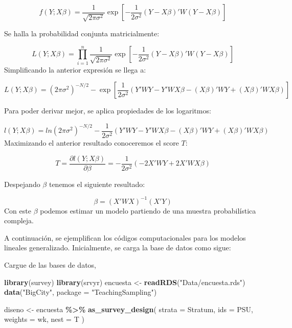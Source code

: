 \documentclass[
  spanish,
  12pt,
]{book}
\newenvironment{Shaded}{\begin{snugshade}}{\end{snugshade}}
\newcommand{\AttributeTok}[1]{\textcolor[rgb]{0.13,0.29,0.53}{#1}}
\newcommand{\FunctionTok}[1]{\textcolor[rgb]{0.13,0.29,0.53}{\textbf{#1}}}
\newcommand{\NormalTok}[1]{#1}
\newcommand{\OtherTok}[1]{\textcolor[rgb]{0.56,0.35,0.01}{#1}}
\newcommand{\SpecialCharTok}[1]{\textcolor[rgb]{0.81,0.36,0.00}{\textbf{#1}}}
\newcommand{\StringTok}[1]{\textcolor[rgb]{0.31,0.60,0.02}{#1}}
\begin{document}
\[
f(Y;X\beta)=\dfrac{1}{\sqrt{2\pi\sigma^{2}}}\exp\left[-\dfrac{1}{2\sigma^{2}}(Y-X\beta)'W(Y-X\beta)\right]
\]

Se halla la probabilidad conjunta matricialmente:

\[
L(Y;X\beta)=\prod_{i=1}^{n}\dfrac{1}{\sqrt{2\pi\sigma^{2}}}\exp\left[-\dfrac{1}{2\sigma^{2}}(Y-X\beta)'W(Y-X\beta)\right]
\]
Simplificando la anterior expresión se llega a:

\[
L(Y;X\beta)=(2\pi\sigma^{2})^{-N/2}-\exp\left[\dfrac{1}{2\sigma^{2}}(Y'WY-Y'WX\beta-(X\beta)'WY+(X\beta)'WX\beta)\right]
\]

Para poder derivar mejor, se aplica propiedades de los logaritmos:

\[
l(Y;X\beta)=ln(2\pi\sigma^{2})^{-N/2}-\dfrac{1}{2\sigma^{2}}(Y'WY-Y'WX\beta-(X\beta)'WY+(X\beta)'WX\beta)
\]
Maximizando el anterior resultado conoceremos el score \(T\):

\[
T=\dfrac{\partial l(Y;X\beta)}{\partial\beta}=-\dfrac{1}{2\sigma^{2}}(-2X'WY+2X'WX\beta)
\]

Despejando \(\beta\) tenemos el siguiente resultado:

\[
\beta=(X'WX)^{-1}(X'Y)
\]
Con este \(\beta\) podemos estimar un modelo partiendo de una muestra probabilística compleja.

A continuación, se ejemplifican los códigos computacionales para los modelos lineales generalizado. Inicialmente, se carga la base de datos como sigue:

Cargue de las bases de datos,

\begin{Shaded}
\begin{Highlighting}[]
\FunctionTok{library}\NormalTok{(survey)}
\FunctionTok{library}\NormalTok{(srvyr)}
\NormalTok{encuesta }\OtherTok{\textless{}{-}} \FunctionTok{readRDS}\NormalTok{(}\StringTok{"Data/encuesta.rds"}\NormalTok{)}
\FunctionTok{data}\NormalTok{(}\StringTok{"BigCity"}\NormalTok{, }\AttributeTok{package =} \StringTok{"TeachingSampling"}\NormalTok{)}
\end{Highlighting}
\end{Shaded}

\begin{Shaded}
\begin{Highlighting}[]
\NormalTok{diseno }\OtherTok{\textless{}{-}}\NormalTok{ encuesta }\SpecialCharTok{\%\textgreater{}\%}
  \FunctionTok{as\_survey\_design}\NormalTok{(}
    \AttributeTok{strata =}\NormalTok{ Stratum,}
    \AttributeTok{ids =}\NormalTok{ PSU,}
    \AttributeTok{weights =}\NormalTok{ wk,}
    \AttributeTok{nest =}\NormalTok{ T}
\NormalTok{  )}
\end{Highlighting}
\end{Shaded}
\end{document}
